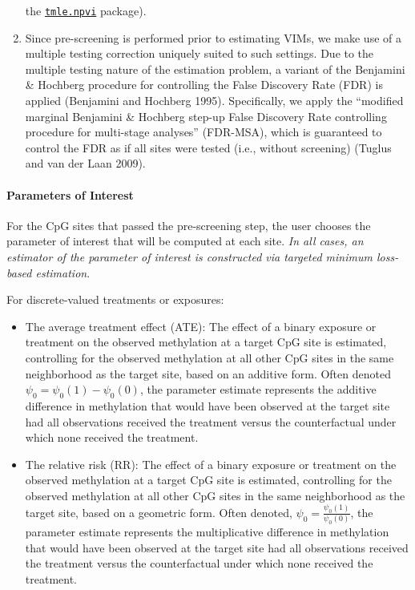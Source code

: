 \documentclass[9pt,a4paper,]{extarticle}
\theoremstyle{definition}
\theoremstyle{definition}
\theoremstyle{definition}
\theoremstyle{remark}
\begin{document}
\begin{enumerate}
  the
  \href{https://CRAN.R-project.org/package=tmle.npvi}{\texttt{tmle.npvi}}
  package).
\item
  Since pre-screening is performed prior to estimating VIMs, we make use
  of a multiple testing correction uniquely suited to such settings. Due
  to the multiple testing nature of the estimation problem, a variant of
  the Benjamini \& Hochberg procedure for controlling the False
  Discovery Rate (FDR) is applied (Benjamini and Hochberg 1995).
  Specifically, we apply the ``modified marginal Benjamini \& Hochberg
  step-up False Discovery Rate controlling procedure for multi-stage
  analyses'' (FDR-MSA), which is guaranteed to control the FDR as if all
  sites were tested (i.e., without screening) (Tuglus and van der Laan
  2009).
\end{enumerate}

\paragraph{Parameters of Interest}\label{parameters-of-interest}

For the CpG sites that passed the pre-screening step, the user chooses
the parameter of interest that will be computed at each site. \emph{In
all cases, an estimator of the parameter of interest is constructed via
targeted minimum loss-based estimation}.

For discrete-valued treatments or exposures:

\begin{itemize}
\item
  The average treatment effect (ATE): The effect of a binary exposure or
  treatment on the observed methylation at a target CpG site is
  estimated, controlling for the observed methylation at all other CpG
  sites in the same neighborhood as the target site, based on an
  additive form. Often denoted \(\psi_0 = \psi_0(1) - \psi_0(0)\), the
  parameter estimate represents the additive difference in methylation
  that would have been observed at the target site had all observations
  received the treatment versus the counterfactual under which none
  received the treatment.
\item
  The relative risk (RR): The effect of a binary exposure or treatment
  on the observed methylation at a target CpG site is estimated,
  controlling for the observed methylation at all other CpG sites in the
  same neighborhood as the target site, based on a geometric form. Often
  denoted, \(\psi_0 = \frac{\psi_0(1)}{\psi_0(0)}\), the parameter
  estimate represents the multiplicative difference in methylation that
  would have been observed at the target site had all observations
  received the treatment versus the counterfactual under which none
  received the treatment.
\end{itemize}
\end{document}
